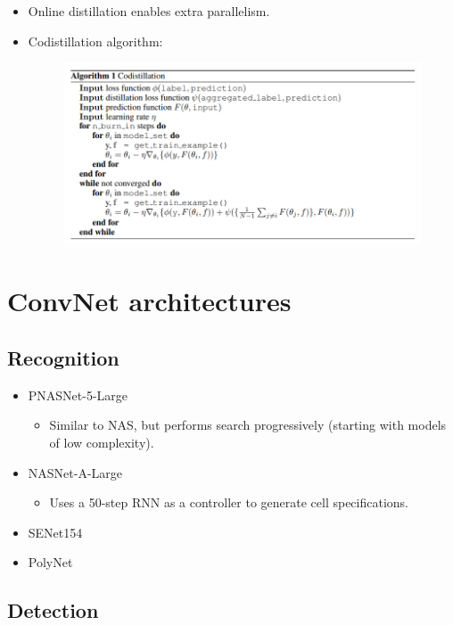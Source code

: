 \begin{itemize}
  \item Online distillation enables extra parallelism.
  \item Codistillation algorithm:

\begin{figure}[H]
   \centering
   \includegraphics[width=\textwidth]{./img/codistillation.png}
\end{figure}

\end{itemize}


\section{ConvNet architectures}

\subsection{Recognition}
\begin{itemize}
  \item PNASNet-5-Large
    \begin{itemize}
      \item Similar to NAS, but performs search progressively (starting with models of low complexity).
    \end{itemize}
  \item NASNet-A-Large
    \begin{itemize}
      \item Uses a 50-step RNN as a controller to generate cell specifications.
    \end{itemize}
  \item SENet154
  \item PolyNet
\end{itemize}

\subsection{Detection}

